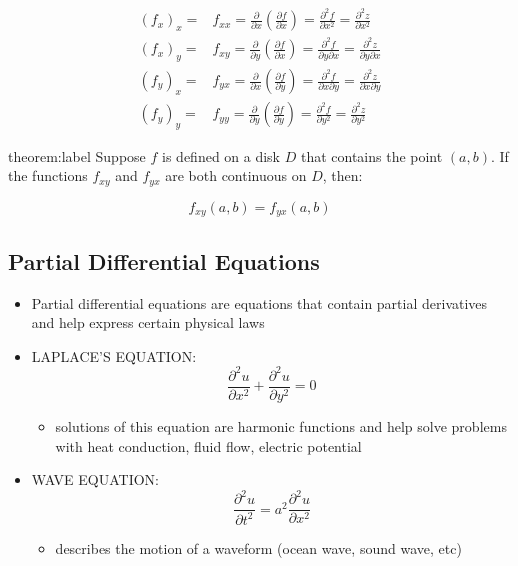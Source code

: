 \documentclass{package/notes}
\begin{document}
$$
\begin{aligned}
	(f_x)_x=&f_{xx}=\frac{\partial}{\partial x}\left(\frac{\partial f}{\partial x}\right)=\frac{\partial^2f}{\partial x^2}=\frac{\partial^2 z}{\partial x^2}\\
	(f_x)_y=&f_{xy}=\frac{\partial}{\partial y}\left(\frac{\partial f}{\partial x}\right)=\frac{\partial^2f}{\partial y\partial x}=\frac{\partial^2 z}{\partial y \partial x}\\
	(f_y)_x=&f_{yx}=\frac{\partial}{\partial x}\left(\frac{\partial f}{\partial y}\right)=\frac{\partial^2f}{\partial x\partial y}=\frac{\partial^2 z}{\partial x \partial y}\\
	(f_y)_y=&f_{yy}=\frac{\partial}{\partial y}\left(\frac{\partial f}{\partial y}\right)=\frac{\partial^2f}{\partial y^2}=\frac{\partial^2 z}{\partial y^2}
\end{aligned}
$$

\begin{theorem}{theorem:label}
	Suppose $f$ is defined on a disk $D$ that contains the point $(a,b)$. If the functions $f_{xy}$ and $f_{yx}$ are both continuous on $D$, then:

	$$f_{xy}(a,b)=f_{yx}(a,b)$$
\end{theorem}

\subsection{Partial Differential Equations}

\begin{itemize}
	\item Partial differential equations are equations that contain partial derivatives and help express certain physical laws
	\item LAPLACE'S EQUATION: $$\frac{\partial^2u}{\partial x^2} + \frac{\partial^2u}{\partial y^2} = 0$$
	\begin{itemize}
		\item solutions of this equation are harmonic functions and help solve problems with heat conduction, fluid flow, electric potential
	\end{itemize}
	\item WAVE EQUATION: $$\frac{\partial^2u}{\partial t^2} = a^2\frac{\partial^2u}{\partial x^2}$$
	\begin{itemize}
		\item describes the motion of a waveform (ocean wave, sound wave, etc)
	\end{itemize}
\end{itemize}
\end{document}
